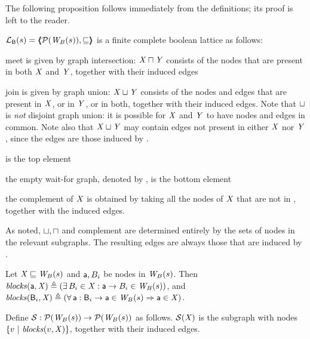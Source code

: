 The following proposition follows immediately from the definitions; its proof is left to the reader.
\begin{proposition} \label{prop:isALattice}
$\mathcal{L}_{\mathsf{B}}({s}) = \langle \hspace{-0.34em} \langle \hspace{-0.34em} \langle  \mathcal{P}(\mathit{W}_{B}({s})), \sqsubseteq  \rangle \hspace{-0.34em} \rangle \hspace{-0.34em} \rangle$ is a finite complete boolean lattice as follows:
\be

\item meet is given by graph intersection: 
$\mathit{X} \sqcap \mathit{Y}$ consists of the nodes that are present in both $\mathit{X}$ and $\mathit{Y}$, together with their induced edges

\item join is given by graph union: $\mathit{X} \sqcup \mathit{Y}$ consists of the nodes and edges that are present in $\mathit{X}$, or in $\mathit{Y}$, or in both, together with their
  induced edges.
 Note that $\sqcup$ is \emph{not} disjoint graph union: 
it is possible for $\mathit{X}$ and $\mathit{Y}$ to have nodes and edges in common. Note also that $\mathit{X} \sqcup \mathit{Y}$ may contain edges not present in either $\mathit{X}$ nor $\mathit{Y}$,
since the edges are those induced by  . 

\item {}  is the top element 

\item  the empty wait-for graph, denoted by \ewfg, is the bottom element

\item the complement \compl{\XS} of $\mathit{X}$ is obtained by taking all the nodes of $\mathit{X}$ that are not in , together with the induced edges.
\ee
\end{proposition}
%
As noted, $\sqcup, \sqcap$ and complement are determined entirely by the sets of nodes in the relevant subgraphs. The resulting edges are always those
that are induced by .



\begin{definition} \label{defn:blocks} 
Let $\mathit{X} \sqsubseteq \mathit{W}_{B}({s})$ and $\mathsf{a}, B_i$ be nodes in $\mathit{W}_{B}({s})$. Then 
$\mathit{blocks}(\mathsf{a}, \mathit{X}) \triangleq (\exists\, B_i \in \mathit{X} : \mathsf{a} \rightarrow B_i \in \mathit{W}_{B}({s}))$, and 
$\mathit{blocks}(\mathsf{B}_i, \mathit{X}) \triangleq (\forall\, \mathsf{a} : \mathsf{B}_i \rightarrow \mathsf{a} \in \mathit{W}_{B}({s}) \Rightarrow \mathsf{a} \in \mathit{X})$.
\end{definition}

\begin{definition}[$\SFs$]  \label{defn:scFix} 
Define $\mathcal{S}: \mathcal{P}(\mathit{W}_{B}({s})) \to \mathcal{P}(\mathit{W}_{B}({s}))$ as follows.
$\mathcal{S}(\mathit{X})$ is the subgraph with nodes $\{ v ~|~ \mathit{blocks}(v, \mathit{X})  \}$, together with their induced edges.
\end{definition}


